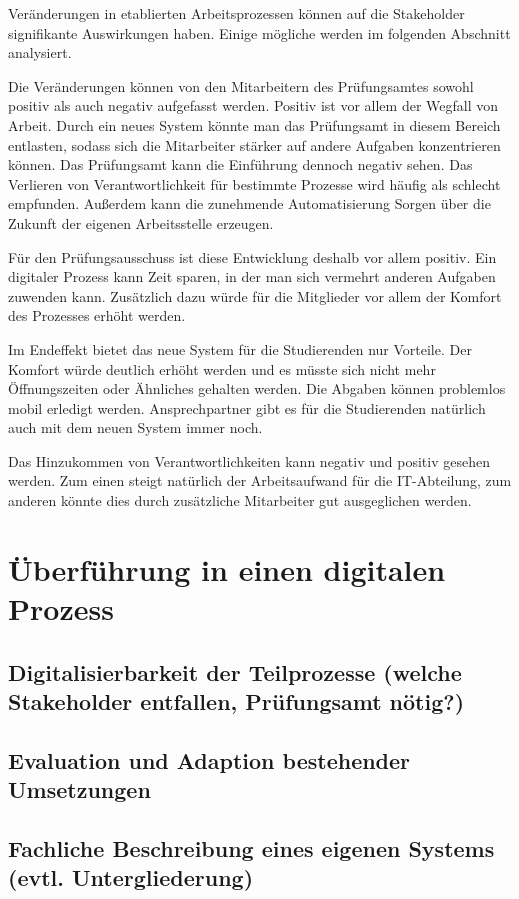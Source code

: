 \documentclass[ngerman]{tudscrreprt}
\begin{document}
Veränderungen in etablierten Arbeitsprozessen können auf die Stakeholder signifikante Auswirkungen haben. Einige mögliche werden im folgenden Abschnitt analysiert.

Die Veränderungen können von den Mitarbeitern des Prüfungsamtes sowohl positiv als auch negativ aufgefasst werden. Positiv ist vor allem der Wegfall von Arbeit. Durch ein neues System könnte man das Prüfungsamt in diesem Bereich entlasten, sodass sich die Mitarbeiter stärker auf andere Aufgaben konzentrieren können. Das Prüfungsamt kann die Einführung dennoch negativ sehen. Das Verlieren von Verantwortlichkeit für bestimmte Prozesse wird häufig als schlecht empfunden. Außerdem kann die zunehmende Automatisierung Sorgen über die Zukunft der eigenen Arbeitsstelle erzeugen.

Für den Prüfungsausschuss ist diese Entwicklung deshalb vor allem positiv. Ein digitaler Prozess kann Zeit sparen, in der man sich vermehrt anderen Aufgaben zuwenden kann. Zusätzlich dazu würde für die Mitglieder vor allem der Komfort des Prozesses erhöht werden.

Im Endeffekt bietet das neue System für die Studierenden nur Vorteile. Der Komfort würde deutlich erhöht werden und es müsste sich nicht mehr Öffnungszeiten oder Ähnliches gehalten werden. Die Abgaben können problemlos mobil erledigt werden. Ansprechpartner gibt es für die Studierenden natürlich auch mit dem neuen System immer noch.

Das Hinzukommen von Verantwortlichkeiten kann negativ und positiv gesehen werden. Zum einen steigt natürlich der Arbeitsaufwand für die IT-Abteilung, zum anderen könnte dies durch zusätzliche Mitarbeiter gut ausgeglichen werden.

\chapter{Überführung in einen digitalen Prozess}

\section{Digitalisierbarkeit der Teilprozesse (welche Stakeholder entfallen, Prüfungsamt nötig?)}

\section{Evaluation und Adaption bestehender Umsetzungen}

\section{Fachliche Beschreibung eines eigenen Systems (evtl. Untergliederung)}
\end{document}
